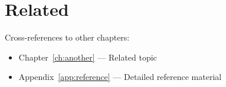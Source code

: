 \section{Related}

Cross-references to other chapters:
\begin{itemize}
    \item Chapter~\ref{ch:another} --- Related topic
    \item Appendix~\ref{app:reference} --- Detailed reference material
\end{itemize}
